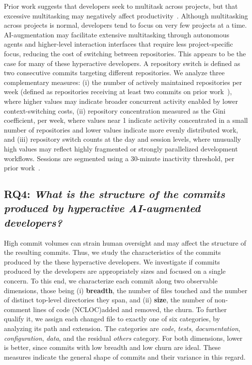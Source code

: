 \documentclass[smallextended]{svjour3}
\begin{document}
Prior work suggests that developers seek to multitask across projects, but that excessive multitasking may negatively affect productivity~\cite{Vasilescu2016sky}. Although multitasking across projects is normal, developers tend to focus on very few projects at a time.
AI-augmentation may facilitate extensive multitasking through autonomous agents and higher-level interaction interfaces that require less project-specific focus, reducing the cost of switching between repositories. This appears to be the case for many of these hyperactive developers.
A repository switch is defined as two consecutive commits targeting different repositories.
We analyze three complementary measures:
(i) the number of actively maintained repositories per week (defined as repositories receiving at least two commits on prior work~\cite{Damota2022deep}), where higher values may indicate broader concurrent activity enabled by lower context-switching costs,
(ii) repository concentration measured as the Gini coefficient, per week, where values near 1 indicate activity concentrated in a small number of repositories and lower values indicate more evenly distributed work,
and (iii) repository switch counts at the day and session levels, where unusually high values may reflect highly fragmented or strongly parallelized development workflows. Sessions are segmented using a 30-minute inactivity threshold, per prior work~\cite{Mozannar2024when}.



\subsection*{RQ4: \emph{What is the structure of the commits produced by hyperactive AI-augmented developers?}}

High commit volumes can strain human oversight and may affect the structure of the resulting commits.
Thus, we study the characteristics of the commits produced by the these hyperactive developers.
We investigate if commits produced by the developers are appropriately sizes and focused on a single concern. To this end, we characterize each commit along two observable dimensions, those being
(i) \textbf{breadth}, the number of files touched and the number of distinct top-level directories they span,
and (ii) \textbf{size}, the number of non-comment lines of code (NCLOC)added and removed, \ie the churn.
To further qualify it, we assign each changed file to exactly one of six categories, by analyzing its path and extension. The categories are \emph{code}, \emph{tests},
\emph{documentation}, \emph{configuration}, \emph{data}, and the residual \emph{others} category.
For both dimensions, lower is better, since commits with low breadth and low churn are ideal.
These measures indicate the general shape of commits and their variance in this regard.
\end{document}

